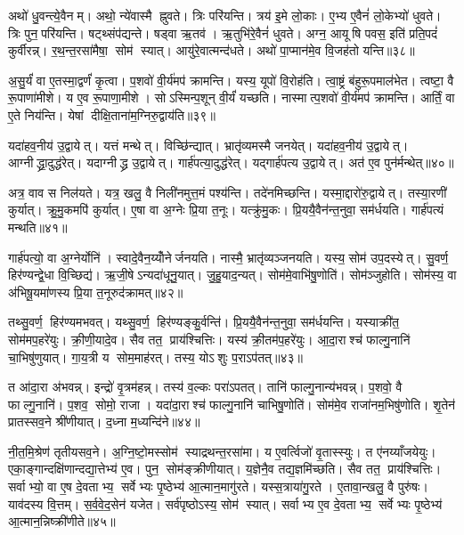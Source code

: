 अथो॑ धु॒वन्त्ये॒वैनम्। अथो॒ न्ये॑वास्मै ह्नुवते। त्रिः परि॑यन्ति। त्रय॑ इ॒मे लो॒काः। ए॒भ्य ए॒वैनं॑ लो॒केभ्यो॑ धुवते। त्रिः पुन॒परि॑यन्ति। षट्थ्संप॑द्यन्ते। षड्वा ऋ॒तव॑। ऋ॒तुभि॑रे॒वैनं॑ धुवते। अग्न॒ आयूषि पवस॒ इति॑ प्रति॒पदं॑ कुर्वीरन्न्। र॒थ॒न्त॒रसा॑मैषा॒ सोम॑ स्यात्। आयु॑रे॒वात्मन्द॑धते। अथो॑ पा॒प्मान॑मे॒व वि॒जह॑तो यन्ति॥३८॥\anuvakamend[अ॒भिजि॑त्यै पृथि॒व्याश्च॒ स्याद॑ध्व॒र्युर्ब्रू॑याल्लो॒कयो॒ परि॑ददति कुर्वीर॒स्त्रीणि॑ च]

अ॒सु॒र्यं॑ वा ए॒तस्मा॒द्वर्णं॑ कृ॒त्वा। प॒शवो॑ वी॒र्य॑मप॑ क्रामन्ति। यस्य॒ यूपो॑ वि॒रोह॑ति। त्वा॒ष्ट्रं ब॑हुरू॒पमाल॑भेत। त्वष्टा॒ वै रू॒पाणा॑मीशे। य ए॒व रू॒पाणा॒मीशे। सोऽस्मिन्प॒शून् वी॒र्यं॑ यच्छति। नास्मात्प॒शवो॑ वी॒र्य॑मप॑ क्रामन्ति। आर्तिं॒ वा ए॒ते निय॑न्ति। येषां दीक्षि॒ताना॑म॒ग्निरु॒द्वाय॑ति॥३९॥

यदा॑हव॒नीय॑ उ॒द्वायेत्। यत्तं मन्थेत्। विच्छि॑न्द्यात्। भ्रातृ॑व्यमस्मै जनयेत्। यदा॑हव॒नीय॑ उ॒द्वायेत्। आग्नीद्ध्रा॒दुद्ध॑रेत्। यदाग्नीद्ध्र उ॒द्वायेत्। गार्\mbox{}ह॑पत्या॒दुद्ध॑रेत्। यद्गार्\mbox{}ह॑पत्य उ॒द्वायेत्। अत॑ ए॒व पुन॑र्मन्थेत्॥४०॥

अत्र॒ वाव स निल॑यते। यत्र॒ खलु॒ वै निली॑नमुत्त॒मं पश्य॑न्ति। तदे॑नमिच्छन्ति। यस्मा॒द्दारो॑रु॒द्वायेत्। तस्या॒रणी॑ कुर्यात्। क्रु॒मु॒कमपि॑ कुर्यात्। ए॒षा वा अ॒ग्नेः प्रि॒या त॒नूः। यत्क्रु॑मु॒कः। प्रि॒ययै॒वैन॑न्त॒नुवा॒ सम॑र्धयति। गार्\mbox{}ह॑पत्यं मन्थति॥४१॥

गार्\mbox{}ह॑पत्यो॒ वा अ॒ग्नेर्योनि॑। स्वादे॒वैन॒य्योँनेर्जनयति। नास्मै॒ भ्रातृ॑व्यञ्जनयति। यस्य॒ सोम॑ उप॒दस्येत्। सु॒वर्ण॒ हिर॑ण्यन्द्वे॒धा वि॒च्छिद्य॑। ऋ॒जी॒षेऽन्यदा॑धूनु॒यात्। जु॒हु॒याद॒न्यत्। सोम॑मे॒वाभि॑षु॒णोति॑। सोम॑ञ्जुहोति। सोम॑स्य॒ वा अ॑भिषू॒यमा॑णस्य प्रि॒या त॒नूरुद॑क्रामत्॥४२॥

तथ्सु॒वर्ण॒ हिर॑ण्यमभवत्। यथ्सु॒वर्ण॒ हिर॑ण्यङ्कु॒र्वन्ति॑। प्रि॒ययै॒वैन॑न्त॒नुवा॒ सम॑र्धयन्ति। यस्याक्री॑त॒ सोम॑मप॒हरे॑युः। क्री॒णी॒यादे॒व। सैव तत॒ प्राय॑श्चित्तिः। यस्य॑ क्री॒तम॑प॒हरे॑युः। आ॒दा॒राश्च॑ फाल्गु॒नानि॑ चा॒भिषु॑णुयात्। गा॒य॒त्री य सोम॒माह॑रत्। तस्य॒ योऽशुः प॒राऽप॑तत्॥४३॥

त आ॑दा॒रा अ॑भवन्न्। इन्द्रो॑ वृ॒त्रम॑हन्न्। तस्य॑ व॒ल्कः परा॑ऽपतत्। तानि॑ फाल्गु॒नान्य॑भवन्न्। प॒शवो॒ वै फाल्गु॒नानि॑। प॒शव॒ सोमो॒ राजा। यदा॑दा॒राश्च॑ फाल्गु॒नानि॑ चाभिषु॒णोति॑। सोम॑मे॒व राजा॑नम॒भिषु॑णोति। शृ॒तेन॑ प्रातस्सव॒ने श्री॑णीयात्। द॒ध्ना म॒ध्यन्दि॑ने॥४४॥

नी॒त॒मि॒श्रेण॑ तृतीयसव॒ने। अ॒ग्नि॒ष्टो॒मस्सोम॑ स्याद्रथन्त॒रसा॑मा। य ए॒वर्त्विजो॑ वृ॒तास्स्युः। त ए॑नय्याँजयेयुः। एका॒ङ्गान्दक्षि॑णान्दद्या॒त्तेभ्य॑ ए॒व। पुन॒ सोम॑ङ्क्रीणीयात्। य॒ज्ञेनै॒व तद्य॒ज्ञमि॑च्छति। सैव तत॒ प्राय॑श्चित्तिः। सर्वाभ्यो॒ वा ए॒ष दे॒वताभ्य॒ सर्वेभ्यः पृ॒ष्ठेभ्य॑ आ॒त्मान॒मागु॑रते। यस्स॒त्राया॑गु॒रते। ए॒तावा॒न्खलु॒ वै पुरु॑षः। याव॑दस्य वि॒त्तम्। स॒र्व॒वे॒द॒सेन॑ यजेत। सर्व॑पृष्ठोऽस्य॒ सोम॑ स्यात्। सर्वाभ्य ए॒व दे॒वताभ्य॒ सर्वेभ्यः पृ॒ष्ठेभ्य॑ आ॒त्मान॒न्निष्क्री॑णीते॥४५॥\anuvakamend[उ॒द्वाय॑ति मन्थेन्मन्थत्यक्रामत्प॒राऽप॑तन्म॒ध्यन्दि॑न आगु॒रते॒ पञ्च॑ च]

